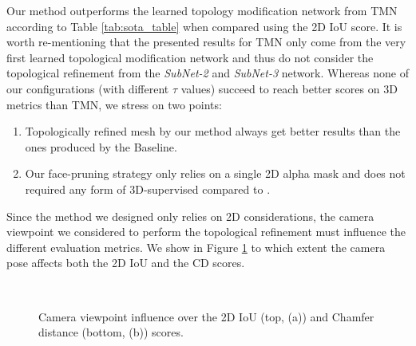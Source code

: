 Our method outperforms the learned topology modification network from TMN\citep{pan2019deep} according to Table \ref{tab:sota_table} when compared using the 2D IoU score. It is worth re-mentioning that the presented results for TMN\citep{pan2019deep} only come from the very first learned topological modification network and thus do not consider the topological refinement from the \textit{SubNet-2} and \textit{SubNet-3} network. Whereas none of our configurations (with different $\tau$ values) succeed to reach better scores on 3D metrics than TMN\citep{pan2019deep}, we stress on two points: \begin{enumerate}
    \item Topologically refined mesh by our method always get better results than the ones produced by the Baseline. 
    \item Our face-pruning strategy only relies on a single 2D alpha mask and does not required any form of 3D-supervised compared to \citep{pan2019deep}. 
\end{enumerate}

Since the method we designed only relies on 2D considerations, the camera viewpoint we considered to perform the topological refinement must influence the different evaluation metrics. We show in Figure \ref{fig:pruning_viewpoint_influence} to which extent the camera pose affects both the 2D IoU and the CD scores.

\begin{figure}[h!]
  \centering
   \\
  \caption{Camera viewpoint influence over the 2D IoU (top, (a)) and Chamfer distance (bottom, (b)) scores.} \label{fig:pruning_viewpoint_influence}
\end{figure}

